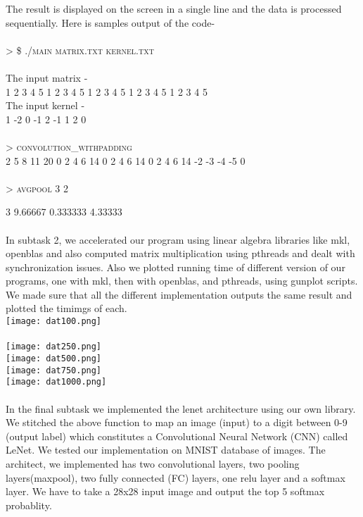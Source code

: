 \documentclass{article}
\begin{document}
The result is displayed on the screen in a single line and the data is processed sequentially. Here is samples output of the code-\\
\\
> \textsc{\$ ./main matrix.txt kernel.txt}
\\
\\
The input matrix -\\
1 2  3 4 5 1 2 3 4 5 1 2 3 4 5 1 2 3 4 5 1 2 3 4 5\\
The input kernel -\\
1 -2 0 -1 2 -1 1 2 0
\\
\\
> \textsc{convolution\_withpadding}
\\
 2 5 8 11 20 0 2 4 6 14 0 2 4 6 14 0 2 4 6 14 -2 -3 -4 -5 0 \\
 \\
> \textsc{avgpool 3 2}

 3 9.66667 0.333333 4.33333
\\
\\
In subtask 2, we accelerated our program using linear algebra libraries like mkl, openblas and also computed matrix multiplication using pthreads and dealt with synchronization issues. Also we plotted running time of different version of our programs, one with mkl, then with openblas, and pthreads, using gunplot scripts. We made sure that all the different implementation outputs the same result and plotted the timimgs of each.\\
\texttt{[image: dat100.png]}\\
\\
\texttt{[image: dat250.png]}\\
\texttt{[image: dat500.png]}\\
\texttt{[image: dat750.png]}\\
\texttt{[image: dat1000.png]}\\
\\
In the final subtask we implemented the lenet architecture\cite{lenetPrototxt} using our own library. We stitched the above function to map an image (input) to a digit between 0-9 (output label) which constitutes a Convolutional Neural Network (CNN) called LeNet. We tested our implementation on MNIST database of images\cite{mnistdatabase}. The architect, we implemented has two convolutional layers, two pooling layers(maxpool), two fully connected (FC) layers, one relu layer and a softmax layer. We have to take a 28x28 input image and output the top 5 softmax probablity.
\end{document}
